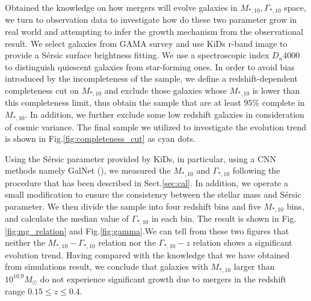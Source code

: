 \documentclass[fleqn,usenatbib]{mnras}
\begin{document}
\par Obtained the knowledge on how mergers will evolve galaxies in $M_{*,10}, \Gamma_{*,10}$ space, we turn to observation data to investigate how do these two parameter grow in real world and attempting to infer the growth mechanism from the observational result. We select galaxies from GAMA survey and use KiDs r-band image to provide a S\'{e}rsic surface brightness fitting. We use a spectroscopic index $D_n 4000$ to distinguish quiescent galaxies from star-forming ones. In order to avoid bias introduced by the incompleteness of the sample, we define a redshift-dependent completeness cut on $M_{*,10}$ and exclude those galaxies whose $M_{*,10}$ is lower than this completeness limit, thus obtain the sample that are at least $95\%$ complete in $M_{*,10}$. In addition, we further exclude some low redshift galaxies in consideration of cosmic variance. The final sample we utilized to investigate the evolution trend is shown in Fig.\ref{fig:completeness_cut} as cyan dots.
\par Using the S\'{e}rsic parameter provided by KiDs, in particular, using a CNN methods namely GalNet (\cite{GaLNet2022}), we measured the $M_{*,10}$ and $\Gamma_{*,10}$ following the procedure that has been described in Sect.\ref{sec:cal}. In addition, we operate a small modification to ensure the consistency between the stellar mass and S\'{e}rsic parameter. We then divide the sample into four redshift bins and five $M_{*,10}$ bins, and calculate the median value of $\Gamma_{*,10}$ in each bin. The result is shown in Fig.\ref{fig:mg_relation} and Fig.\ref{fig:gamma}.We can tell from these two figures that neither the $M_{*,10} - \Gamma_{*,10}$ relation nor the $\Gamma_{*,10} - z$ relation shows a significant evolution trend. Having compared with the knowledge that we have obtained from simulations result, we conclude that galaxies with $M_{*,10}$ larger than  $10^{10.9} M_{\odot}$ do not experience significant growth due to mergers in the redshift range $0.15 \leq z \leq 0.4$.
\end{document}
